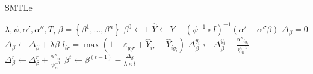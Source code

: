 \begin{algorithm}\label{alg:1}
       \caption{SMTLe}\label{alg:1}
        \begin{algorithmic}[1]
            \REQUIRE $\lambda, \psi,\alpha',\alpha'',T$,
            \ENSURE $\beta=\left\{\beta^1,...,\beta^n\right\}$
            \STATE $\beta^0 \leftarrow 1$
                \STATE $\hat Y \leftarrow Y - {\left( {\psi^{-1} \circ I} \right)^{ - 1}}\left( \alpha' - \alpha''\beta \right)$
                \STATE ${\Delta _\beta }=0$
                	\STATE ${\Delta _\beta }\leftarrow {\Delta _\beta }+\lambda\beta$ 
	                    \STATE $l_{ir} = \max(1 - {\varepsilon _{{y_i}r}} + {\hat Y_{ir}} - {\hat Y_{i{y_i}}})$
	                            \STATE $\Delta _\beta^{{y_i}} \leftarrow \Delta _\beta^{{y_i}} - \frac{{{\alpha''_{i{y_i}}}}}{{{\psi^{-1}_{ii}}}}$%
	                            \STATE $\Delta _\beta^{{r}} \leftarrow \Delta _\beta^{{r}} + \frac{{{\alpha''_{i{r}}}}}{{{\psi^{-1}_{ii}}}}$%
	                    \ENDIF
                \ENDFOR %
                \STATE $\beta^t  \leftarrow \beta^{(t-1)}  - \frac{{{\Delta _\beta }}}{{\lambda\times {t} }}$
             \ENDFOR %
        \end{algorithmic}
\end{algorithm}